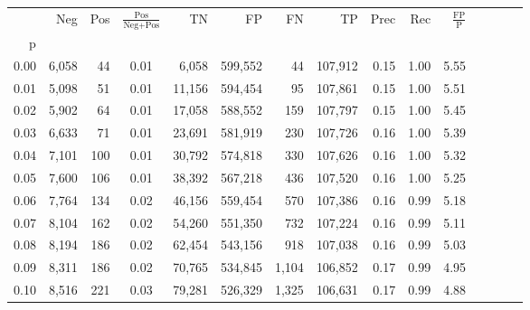 \begin{tabular}{rrrcrrrrrrrrrrr}
\toprule
{} &    Neg &    Pos & $\frac{\text{Pos}}{\text{Neg}+\text{Pos}}$ &       TN &       FP &       FN &       TP &  Prec &   Rec & $\frac{\text{FP}}{\text{P}}$ \\
p    &        &        &                                            &          &          &          &          &       &       &                              \\
\midrule
0.00 &  6,058 &     44 &                                       0.01 &    6,058 &  599,552 &       44 &  107,912 &  0.15 &  1.00 &                         5.55 \\
0.01 &  5,098 &     51 &                                       0.01 &   11,156 &  594,454 &       95 &  107,861 &  0.15 &  1.00 &                         5.51 \\
0.02 &  5,902 &     64 &                                       0.01 &   17,058 &  588,552 &      159 &  107,797 &  0.15 &  1.00 &                         5.45 \\
0.03 &  6,633 &     71 &                                       0.01 &   23,691 &  581,919 &      230 &  107,726 &  0.16 &  1.00 &                         5.39 \\
0.04 &  7,101 &    100 &                                       0.01 &   30,792 &  574,818 &      330 &  107,626 &  0.16 &  1.00 &                         5.32 \\
0.05 &  7,600 &    106 &                                       0.01 &   38,392 &  567,218 &      436 &  107,520 &  0.16 &  1.00 &                         5.25 \\
0.06 &  7,764 &    134 &                                       0.02 &   46,156 &  559,454 &      570 &  107,386 &  0.16 &  0.99 &                         5.18 \\
0.07 &  8,104 &    162 &                                       0.02 &   54,260 &  551,350 &      732 &  107,224 &  0.16 &  0.99 &                         5.11 \\
0.08 &  8,194 &    186 &                                       0.02 &   62,454 &  543,156 &      918 &  107,038 &  0.16 &  0.99 &                         5.03 \\
0.09 &  8,311 &    186 &                                       0.02 &   70,765 &  534,845 &    1,104 &  106,852 &  0.17 &  0.99 &                         4.95 \\
0.10 &  8,516 &    221 &                                       0.03 &   79,281 &  526,329 &    1,325 &  106,631 &  0.17 &  0.99 &                         4.88 \\

\end{tabular}
